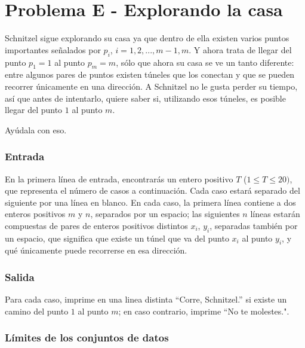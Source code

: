 \chapter*{Problema E - Explorando la casa}


Schnitzel sigue explorando su casa ya que dentro de ella existen varios puntos importantes señalados por $p_i$, $i=1,2,...,m-1,m$. 
Y ahora trata de llegar del  punto $p_1=1$ al punto $p_m=m$, sólo que ahora su casa se ve un tanto diferente: entre algunos pares de puntos existen túneles que los conectan y que se pueden recorrer únicamente en una dirección. 
A Schnitzel no le gusta perder su tiempo, así que antes de intentarlo, quiere saber si, utilizando esos túneles, es posible llegar del punto $1$ al punto $m$.

Ayúdala con eso.

\subsection*{Entrada}

En la primera línea de entrada, encontrarás un entero positivo $T$ ($1 \leq T \leq 20)$, que representa el número de casos a continuación. Cada caso estará separado del siguiente por una línea en blanco. En cada caso, la primera línea contiene a dos enteros positivos $m$ y $n$,  separados por un espacio; las siguientes $n$ líneas
estarán compuestas de pares de enteros positivos distintos $x_i$, $y_i$, separadas también por un espacio, que significa que existe un túnel que va del punto $x_i$ al punto $y_i$, y qué únicamente puede recorrerse en esa dirección.


\subsection*{Salida}

Para cada caso, imprime en una linea distinta ``Corre, Schnitzel.'' si existe un camino del punto $1$ al punto $m$; en caso contrario, imprime ``No te molestes.".


\subsection*{Límites de los conjuntos de datos}

